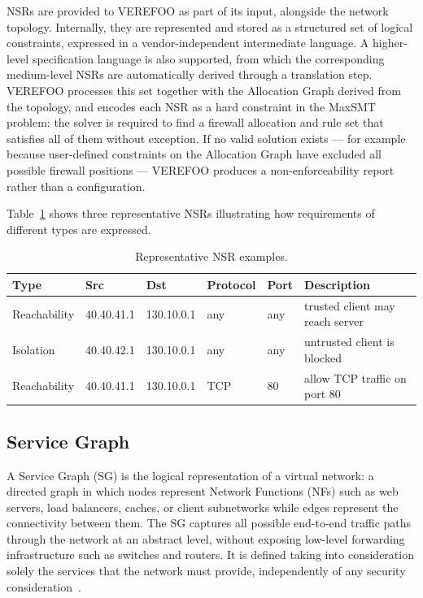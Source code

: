 NSRs are provided to VEREFOO as part of its input, alongside the network topology. Internally, they are represented and stored as a structured set of logical constraints, expressed in a vendor-independent intermediate language. A higher-level specification language is also supported, from which the corresponding medium-level NSRs are automatically derived through a translation step. VEREFOO processes this set together with the Allocation Graph derived from the topology, and encodes each NSR as a hard constraint in the MaxSMT problem: the solver is required to find a firewall allocation and rule set that satisfies all of them without exception. If no valid solution exists — for example because user-defined constraints on the Allocation Graph have excluded all possible firewall positions — VEREFOO produces a non-enforceability report rather than a configuration. 

Table~\ref{tab:nsr-examples} shows three representative NSRs illustrating how requirements of different types are expressed.

\begin{table}[H]
\centering
\caption{Representative NSR examples.}
\label{tab:nsr-examples}
\begin{tabularx}{\textwidth}{lllllX}
\hline
\textbf{Type} & \textbf{Src} & \textbf{Dst} & \textbf{Protocol} & \textbf{Port} & \textbf{Description} \\
\hline
Reachability & 40.40.41.1 & 130.10.0.1 & any & any & trusted client may reach server \\
Isolation    & 40.40.42.1 & 130.10.0.1 & any & any & untrusted client is blocked \\
Reachability & 40.40.41.1 & 130.10.0.1 & TCP & 80  & allow TCP traffic on port 80 \\
\hline
\end{tabularx}
\end{table}

\subsection{Service Graph}

A Service Graph (SG) is the logical representation of a virtual network: a directed graph in which nodes represent Network Functions (NFs) such as web servers, load balancers, caches, or client subnetworks while edges represent the connectivity between them. The SG captures all possible end-to-end traffic paths through the network at an abstract level, without exposing low-level forwarding infrastructure such as switches and routers. It is defined taking into consideration solely the services that the network must provide, independently of any security consideration~\cite{verefoo}.

